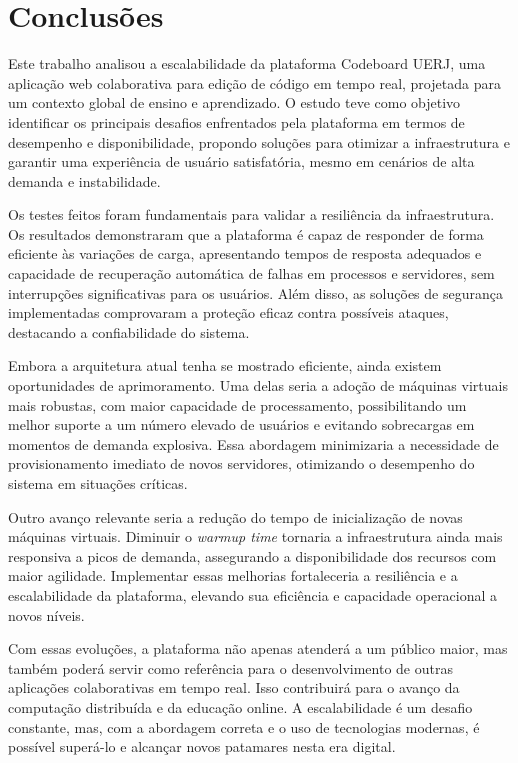 \chapter*{Conclusões}

Este trabalho analisou a escalabilidade da plataforma Codeboard UERJ, uma aplicação web colaborativa para edição de código em tempo real, projetada para um contexto global de ensino e aprendizado. O estudo teve como objetivo identificar os principais desafios enfrentados pela plataforma em termos de desempenho e disponibilidade, propondo soluções para otimizar a infraestrutura e garantir uma experiência de usuário satisfatória, mesmo em cenários de alta demanda e instabilidade.

Os testes feitos foram fundamentais para validar a resiliência da infraestrutura. Os resultados demonstraram que a plataforma é capaz de responder de forma eficiente às variações de carga, apresentando tempos de resposta adequados e capacidade de recuperação automática de falhas em processos e servidores, sem interrupções significativas para os usuários. Além disso, as soluções de segurança implementadas comprovaram a proteção eficaz contra possíveis ataques, destacando a confiabilidade do sistema.

Embora a arquitetura atual tenha se mostrado eficiente, ainda existem oportunidades de aprimoramento. Uma delas seria a adoção de máquinas virtuais mais robustas, com maior capacidade de processamento, possibilitando um melhor suporte a um número elevado de usuários e evitando sobrecargas em momentos de demanda explosiva. Essa abordagem minimizaria a necessidade de provisionamento imediato de novos servidores, otimizando o desempenho do sistema em situações críticas.

Outro avanço relevante seria a redução do tempo de inicialização de novas máquinas virtuais. Diminuir o \emph{warmup time} tornaria a infraestrutura ainda mais responsiva a picos de demanda, assegurando a disponibilidade dos recursos com maior agilidade. Implementar essas melhorias fortaleceria a resiliência e a escalabilidade da plataforma, elevando sua eficiência e capacidade operacional a novos níveis.

Com essas evoluções, a plataforma não apenas atenderá a um público maior, mas também poderá servir como referência para o desenvolvimento de outras aplicações colaborativas em tempo real. Isso contribuirá para o avanço da computação distribuída e da educação online. A escalabilidade é um desafio constante, mas, com a abordagem correta e o uso de tecnologias modernas, é possível superá-lo e alcançar novos patamares nesta era digital.